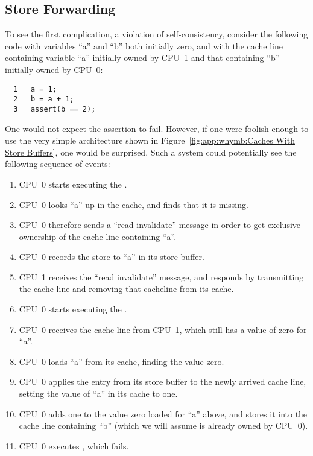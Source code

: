 \subsection{Store Forwarding}
\label{sec:app:whymb:Store Forwarding}

To see the first complication, a violation of self-consistency,
consider the following code with variables ``a'' and ``b'' both initially
zero, and with the cache line containing variable ``a'' initially
owned by CPU~1 and that containing ``b'' initially owned by CPU~0:

\vspace{5pt}
\begin{minipage}[t]{\columnwidth}
\small
\begin{verbatim}
  1   a = 1;
  2   b = a + 1;
  3   assert(b == 2);
\end{verbatim}
\end{minipage}
\vspace{5pt}

One would not expect the assertion to fail.
However, if one were foolish enough to use the very simple architecture
shown in
Figure~\ref{fig:app:whymb:Caches With Store Buffers},
one would be surprised.
Such a system could potentially see the following sequence of events:
\begin{enumerate}
\item	CPU~0 starts executing the .
\item	CPU~0 looks ``a'' up in the cache, and finds that it is missing.
\item	CPU~0 therefore sends a ``read invalidate'' message in order to
	get exclusive ownership of the cache line containing ``a''.
\item	CPU~0 records the store to ``a'' in its store buffer.
\item	CPU~1 receives the ``read invalidate'' message, and responds
	by transmitting the cache line and removing that cacheline from
	its cache.
\item	CPU~0 starts executing the .
\item	CPU~0 receives the cache line from CPU~1, which still has
	a value of zero for ``a''.
\item	CPU~0 loads ``a'' from its cache, finding the value zero.
	\label{item:app:whymb:Need Store Buffer}
\item	CPU~0 applies the entry from its store buffer to the newly
	arrived cache line, setting the value of ``a'' in its cache
	to one.
\item	CPU~0 adds one to the value zero loaded for ``a'' above,
	and stores it into the cache line containing ``b''
	(which we will assume is already owned by CPU~0).
\item	CPU~0 executes , which fails.
\end{enumerate}

